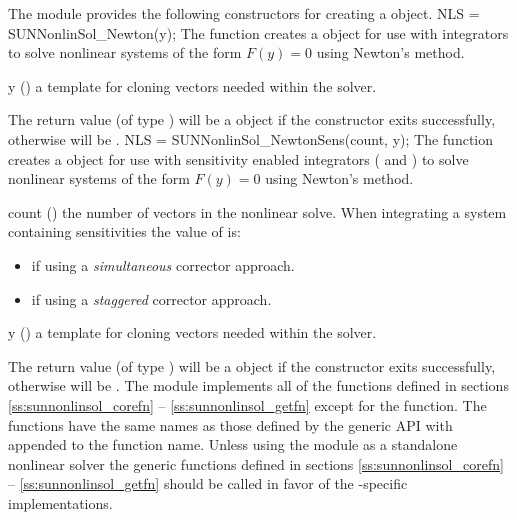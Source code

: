 The {\sunnonlinsolnewton} module provides the following constructors
for creating a \newline
{} object.
{
  NLS = SUNNonlinSol\_Newton(y);
}
{
  The function  creates a
   object for use with {\sundials} integrators to
  solve nonlinear systems of the form $F(y) = 0$ using Newton's method.
}
{
  \begin{args}[y]
  \item[y] ()
    a template for cloning vectors needed within the solver.
  \end{args}
}
{
  The return value  (of type ) will be
  a {\sunnonlinsol} object if the constructor exits successfully,
  otherwise  will be .
}
{}
{
  NLS = SUNNonlinSol\_NewtonSens(count, y);
}
{
  The function  creates a
   object for use with {\sundials} sensitivity enabled
  integrators ({\cvodes} and {\idas}) to solve nonlinear systems of the form
  $F(y) = 0$ using Newton's method.
}
{
  \begin{args}[count]
  \item[count] ()
    the number of vectors in the nonlinear solve. When integrating a system
    containing  sensitivities the value of  is:
    \begin{itemize}
      \item {} if using a \textit{simultaneous} corrector approach.
      \item {} if using a \textit{staggered} corrector approach.
    \end{itemize}
  \item[y] ()
    a template for cloning vectors needed within the solver.
  \end{args}
}
{
  The return value  (of type ) will be
  a {\sunnonlinsol} object if the constructor exits successfully,
  otherwise  will be .
}
{}
The {\sunnonlinsolnewton} module implements all of the functions
defined in sections \ref{ss:sunnonlinsol_corefn} --
\ref{ss:sunnonlinsol_getfn} except for the  function. The
{\sunnonlinsolnewton} functions have the same names as those defined
by the generic {\sunnonlinsol} API with  appended to the
function name. Unless using the {\sunnonlinsolnewton} module as a
standalone nonlinear solver the generic functions defined in sections
\ref{ss:sunnonlinsol_corefn} -- \ref{ss:sunnonlinsol_getfn} should be
called in favor of the {\sunnonlinsolnewton}-specific implementations.

